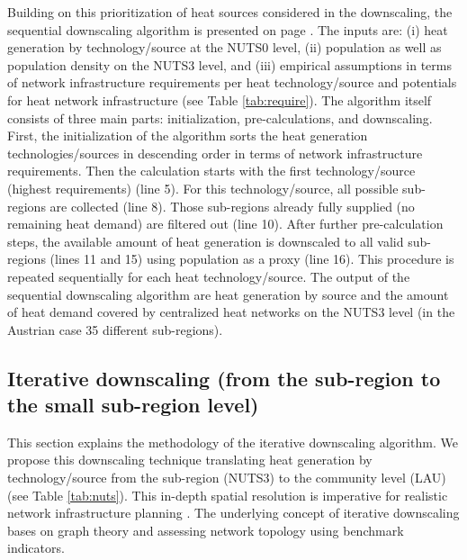 Building on this prioritization of heat sources considered in the downscaling, the sequential downscaling algorithm is presented on page \pageref{Alg:1}. The inputs are: (i) heat generation by technology/source at the NUTS0 level, (ii) population as well as population density on the NUTS3 level, and (iii) empirical assumptions in terms of network infrastructure requirements per heat technology/source and potentials for heat network infrastructure (see Table \ref{tab:require}). The algorithm itself consists of three main parts: initialization, pre-calculations, and downscaling. First, the initialization of the algorithm sorts the heat generation technologies/sources in descending order in terms of network infrastructure requirements. Then the calculation starts with the first technology/source (highest requirements) (line 5). For this technology/source, all possible sub-regions are collected (line 8). Those sub-regions already fully supplied (no remaining heat demand) are filtered out (line 10). After further pre-calculation steps, the available amount of heat generation is downscaled to all valid sub-regions (lines 11 and 15) using population as a proxy (line 16). This procedure is repeated sequentially for each heat technology/source. The output of the sequential downscaling algorithm are heat generation by source and the amount of heat demand covered by centralized heat networks on the NUTS3 level (in the Austrian case 35 different sub-regions). 

\subsection{Iterative downscaling (from the sub-region to the small sub-region level)}\label{alg2}
This section explains the methodology of the iterative downscaling algorithm. We propose this downscaling technique translating heat generation by technology/source from the sub-region (NUTS3) to the community level (LAU) (see Table \ref{tab:nuts}). This in-depth spatial resolution is imperative for realistic network infrastructure planning \cite{zvoleff2009impact}. The underlying concept of iterative downscaling bases on graph theory and assessing network topology using benchmark indicators. 

